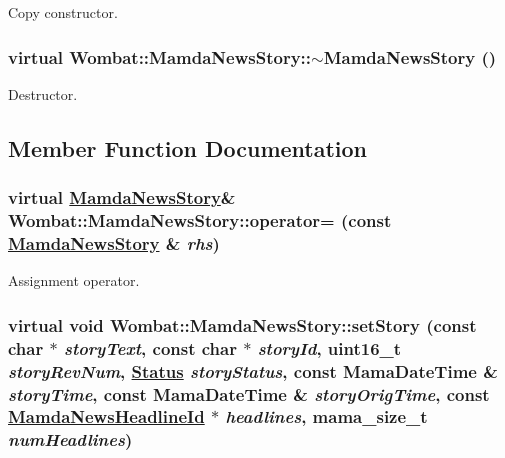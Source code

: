 Copy constructor. 

\hypertarget{classWombat_1_1MamdaNewsStory_deac4e7b52a782e3589b3f31686d4f3f}{
\subsubsection[$\sim$MamdaNewsStory]{\setlength{\rightskip}{0pt plus 5cm}virtual Wombat::Mamda\-News\-Story::$\sim$Mamda\-News\-Story ()}}
\label{classWombat_1_1MamdaNewsStory_deac4e7b52a782e3589b3f31686d4f3f}


Destructor. 



\subsection{Member Function Documentation}
\hypertarget{classWombat_1_1MamdaNewsStory_f344d607c50491850bc85b8673671801}{
\subsubsection[operator=]{\setlength{\rightskip}{0pt plus 5cm}virtual \hyperlink{classWombat_1_1MamdaNewsStory}{Mamda\-News\-Story}\& Wombat::Mamda\-News\-Story::operator= (const \hyperlink{classWombat_1_1MamdaNewsStory}{Mamda\-News\-Story} \& {\em rhs})}}
\label{classWombat_1_1MamdaNewsStory_f344d607c50491850bc85b8673671801}


Assignment operator. 

\hypertarget{classWombat_1_1MamdaNewsStory_df49ed635f59590744796d30a05fc81a}{
\subsubsection[setStory]{\setlength{\rightskip}{0pt plus 5cm}virtual void Wombat::Mamda\-News\-Story::set\-Story (const char $\ast$ {\em story\-Text}, const char $\ast$ {\em story\-Id}, uint16\_\-t {\em story\-Rev\-Num}, \hyperlink{classWombat_1_1MamdaNewsStory_25ee81ce6b01be03a95ab954acdb1e6d}{Status} {\em story\-Status}, const Mama\-Date\-Time \& {\em story\-Time}, const Mama\-Date\-Time \& {\em story\-Orig\-Time}, const \hyperlink{namespaceWombat_cb354a5fc91d5b728f8f1255aae3e196}{Mamda\-News\-Headline\-Id} $\ast$ {\em headlines}, mama\_\-size\_\-t {\em num\-Headlines})}}
\label{classWombat_1_1MamdaNewsStory_df49ed635f59590744796d30a05fc81a}


